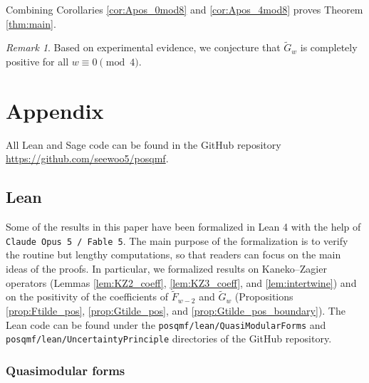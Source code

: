 \documentclass[10pt,reqno]{amsproc}
\newcommand{\wtilde}{\widetilde}
\newcommand{\1}{\mathds{1}}	%
\theoremstyle{definition}
\theoremstyle{remark}
\newtheorem{remark}[theorem]{Remark}
\begin{document}
Combining Corollaries \ref{cor:Apos_0mod8} and \ref{cor:Apos_4mod8} proves Theorem \ref{thm:main}.

\begin{remark}
    Based on experimental evidence, we conjecture that $\widetilde{G}_w$ is completely positive for all $w \equiv 0 \pmod{4}$.
\end{remark}


\section*{Appendix}
\renewcommand{\thesubsection}{\Alph{subsection}}
\renewcommand{\theHsubsection}{appendix.\arabic{subsection}}
\setcounter{subsection}{0}

All Lean and Sage code can be found in the GitHub repository \url{https://github.com/seewoo5/posqmf}.

\subsection{Lean}
\label{subsec:lean}

Some of the results in this paper have been formalized in Lean 4 with the help of \texttt{Claude Opus 5 / Fable 5}.
The main purpose of the formalization is to verify the routine but lengthy computations, so that readers can focus on the main ideas of the proofs.
In particular, we formalized results on Kaneko--Zagier operators (Lemmas \ref{lem:KZ2_coeff}, \ref{lem:KZ3_coeff}, and \ref{lem:intertwine}) and on the positivity of the coefficients of $\wtilde{F}_{w-2}$ and $\wtilde{G}_w$ (Propositions \ref{prop:Ftilde_pos}, \ref{prop:Gtilde_pos}, and \ref{prop:Gtilde_pos_boundary}).
The Lean code can be found under the \texttt{posqmf/lean/QuasiModularForms} and \texttt{posqmf/lean/UncertaintyPrinciple} directories of the GitHub repository.


\subsubsection{Quasimodular forms}
\end{document}
